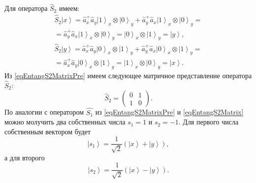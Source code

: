 Для оператора $\hat{S}_2$ имеем:
\begin{eqnarray}
\hat{S}_2 \left|x\right> = \hat{a}_x^{+} \hat{a}_y
\left|1\right>_x\otimes\left|0\right>_y + \hat{a}_y^{+}
\hat{a}_x\left|1\right>_x\otimes\left|0\right>_y =
\nonumber \\
= 
\hat{a}_y^{+}
\hat{a}_x\left|1\right>_x\otimes\left|0\right>_y =
\left|0\right>_x\otimes\left|1\right>_y = \left|y\right>,
\nonumber \\
\hat{S}_2 \left|y\right> = \hat{a}_x^{+} \hat{a}_y
\left|0\right>_x\otimes\left|1\right>_y + \hat{a}_y^{+}
\hat{a}_x\left|0\right>_x\otimes\left|1\right>_y =
\nonumber \\
=
\hat{a}_x^{+} \hat{a}_y
\left|0\right>_x\otimes\left|1\right>_y
=\left|1\right>_x\otimes\left|0\right>_y = \left|x\right>.
\label{eqEntangS2MatrixPre}
\end{eqnarray}
Из \eqref{eqEntangS2MatrixPre} имеем следующее матричное представление
оператора $\hat{S}_2$:
\begin{equation}
\hat{S}_2 = 
\left(
\begin{array}{cc}
0 & 1 \\
1 & 0 
\end{array}
\right).
\label{eqEntangS2Matrix}
\end{equation}
По аналогии с оператором $\hat{S_1}$ из \eqref{eqEntangS2MatrixPre} и
\eqref{eqEntangS2Matrix} можно молучить два собственных числа $s_1 =
1$ и $s_2 = -1$.
Для первого числа собственным вектором будет
\begin{equation}
\left|s_1\right> = \frac{1}{\sqrt{2}}\left(\left|x\right> +
\left|y\right>\right),
\label{eq:part2:pol:stocks_s2_1}
\end{equation}
а для второго
\begin{equation}
\left|s_2\right> = \frac{1}{\sqrt{2}}\left(\left|x\right> - \left|y\right>\right).
\label{eq:part2:pol:stocks_s2_2}
\end{equation}


